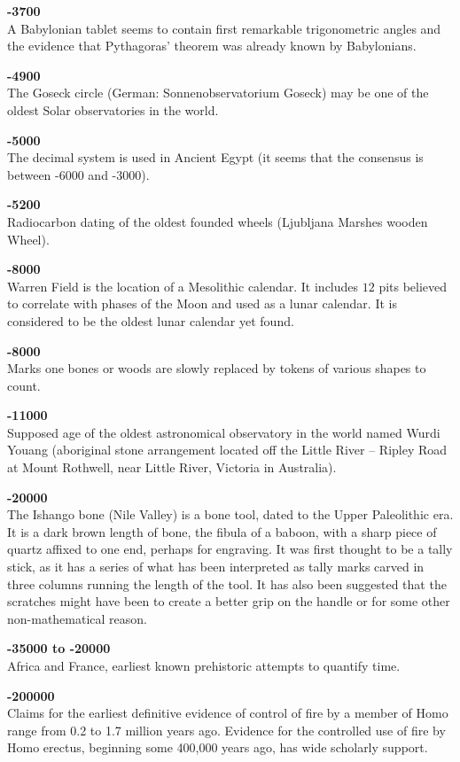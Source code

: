 \textbf{-3700}\\
A Babylonian tablet seems to contain first remarkable trigonometric angles and the evidence that Pythagoras' theorem was already known by Babylonians.

\textbf{-4900}\\
The Goseck circle (German: Sonnenobservatorium Goseck) may be one of the oldest Solar observatories in the world.

\textbf{-5000}\\
The decimal system is used in Ancient Egypt (it seems that the consensus is between -6000 and -3000).

\textbf{-5200}\\
Radiocarbon dating of the oldest founded wheels (Ljubljana Marshes wooden Wheel).

\textbf{-8000}\\
Warren Field is the location of a Mesolithic calendar. It includes $12$ pits believed to correlate with phases of the Moon and used as a lunar calendar. It is considered to be the oldest lunar calendar yet found.

\textbf{-8000}\\
Marks one bones or woods are slowly replaced by tokens of various shapes to count.

\textbf{-11000}\\
Supposed age of the oldest astronomical observatory in the world named Wurdi Youang (aboriginal stone arrangement located off the Little River – Ripley Road at Mount Rothwell, near Little River, Victoria in Australia).

\textbf{-20000}\\
The Ishango bone (Nile Valley) is a bone tool, dated to the Upper Paleolithic era. It is a dark brown length of bone, the fibula of a baboon, with a sharp piece of quartz affixed to one end, perhaps for engraving. It was first thought to be a tally stick, as it has a series of what has been interpreted as tally marks carved in three columns running the length of the tool. It has also been suggested that the scratches might have been to create a better grip on the handle or for some other non-mathematical reason.

\textbf{-35000 to -20000}\\
Africa and France, earliest known prehistoric attempts to quantify time.

\textbf{-200000}\\
Claims for the earliest definitive evidence of control of fire by a member of Homo range from 0.2 to 1.7 million years ago. Evidence for the controlled use of fire by Homo erectus, beginning some 400,000 years ago, has wide scholarly support.